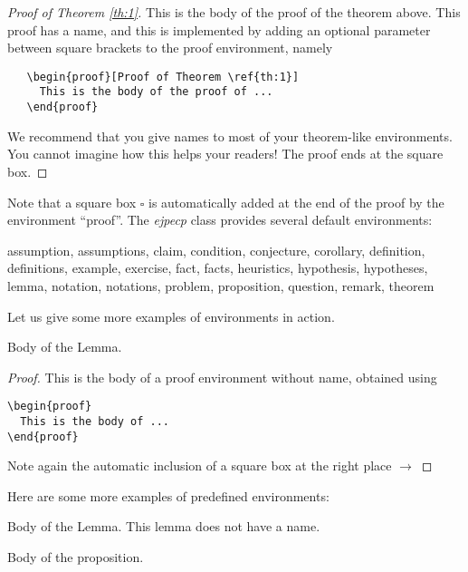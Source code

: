 \documentclass[ECP]{ejpecp} %
\begin{document}
 \begin{proof}[Proof of Theorem \ref{th:1}]
   This is the body of the proof of the theorem above. This proof has a name,
   and this is implemented by adding an optional parameter between square
   brackets to the proof environment, namely
   \begin{verbatim}
   \begin{proof}[Proof of Theorem \ref{th:1}]
     This is the body of the proof of ...
   \end{proof}
   \end{verbatim}
   We recommend that you give names to most of your theorem-like environments.
   You cannot imagine how this helps your readers! The proof ends at the
   square box.
 \end{proof}

 Note that a square box $\square$ is automatically added at the end of the
 proof by the environment ``proof''. The \emph{ejpecp} class provides several
 default environments:
\begin{center}
  \small\ttfamily assumption, assumptions, claim, condition, conjecture,
  corollary, definition, definitions, example, exercise, fact, facts,
  heuristics, hypothesis, hypotheses, lemma, notation, notations, problem,
  proposition, question, remark, theorem
\end{center}

Let us give some more examples of environments in action.

 \begin{lemma}[My lemma]
   Body of the Lemma.
 \end{lemma}

 \begin{proof}
   This is the body of a proof environment without name, obtained using
\begin{verbatim}
\begin{proof}
  This is the body of ...
\end{proof}
\end{verbatim}
   Note again the automatic inclusion of a square box at the right place $\to$
 \end{proof}

Here are some more examples of predefined environments:

 \begin{lemma}
   Body of the Lemma. This lemma does not have a name.
 \end{lemma}

 \begin{proposition}[My proposition]
   Body of the proposition.
 \end{proposition}
\end{document}
